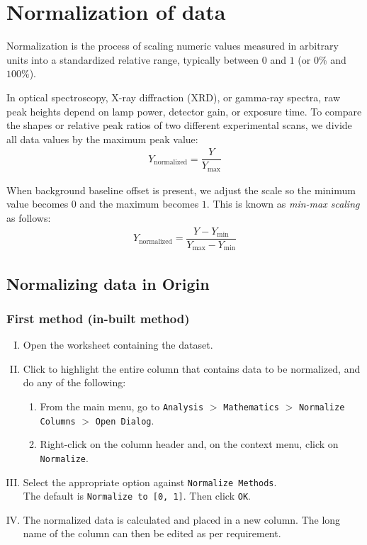 \section{Normalization of data}
	Normalization is the process of scaling numeric values measured in arbitrary units into a standardized relative range, typically between $0$ and $1$ (or $0\%$ and $100\%$).
	
	In optical spectroscopy, X-ray diffraction (XRD), or gamma-ray spectra, raw peak heights depend on lamp power, detector gain, or exposure time. To compare the shapes or relative peak ratios of two different experimental scans, we divide all data values by the maximum peak value:
	\begin{align*}
		Y_\text{normalized}=\dfrac{Y}{Y_\text{max}}
	\end{align*}
	
	When background baseline offset is present, we adjust the scale so the minimum value becomes $0$ and the maximum becomes $1$. This is known as \emph{min-max scaling} as follows:
	\begin{align*}
		Y_\text{normalized}=\dfrac{Y-Y_\text{min}}{Y_\text{max}-Y_\text{min}}
	\end{align*}
	
	\subsection{Normalizing data in Origin}
	
		\subsubsection{First method (in-built method)}
			\begin{enumerate}[I.]
				\item Open the worksheet containing the dataset.
				
				\item Click to highlight the entire column that contains data to be normalized, and do any of the following:
				\begin{enumerate}
					\item From the main menu, go to \verb|Analysis| $>$ \verb|Mathematics| $>$ \verb|Normalize Columns| $>$ \verb|Open Dialog|.
					\item Right-click on the column header and, on the context menu, click on \verb|Normalize|.
				\end{enumerate}
				
				\item Select the appropriate option against \verb|Normalize Methods|.\\ The default is \verb|Normalize to [0, 1]|. Then click \verb|OK|.
				
				\item The normalized data is calculated and placed in a new column. The long name of the column can then be edited as per requirement.
			\end{enumerate}
			
